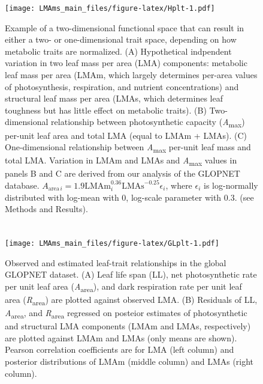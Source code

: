 \documentclass[
  12pt,
]{article}
\providecommand{\DIFaddbeginFL}{} %
\providecommand{\DIFaddendFL}{} %
\providecommand{\DIFdelbeginFL}{} %
\providecommand{\DIFdelendFL}{} %
\newcommand{\DIFscaledelfig}{0.5}
\newlength{\DIFdelgraphicswidth} %
\newlength{\DIFdelgraphicsheight} %
\newcommand{\DIFaddincludegraphics}[2][]{{\color{blue}\fbox{\DIFOincludegraphics[#1]{#2}}}} %
\newcommand{\DIFdelincludegraphics}[2][]{%
\sbox{\DIFdelgraphicsbox}{\DIFOincludegraphics[#1]{#2}}%
\settoboxwidth{\DIFdelgraphicswidth}{\DIFdelgraphicsbox} %
\settoboxtotalheight{\DIFdelgraphicsheight}{\DIFdelgraphicsbox} %
\scalebox{\DIFscaledelfig}{%
\parbox[b]{\DIFdelgraphicswidth}{\usebox{\DIFdelgraphicsbox}\\[-\baselineskip] \rule{\DIFdelgraphicswidth}{0em}}\llap{\resizebox{\DIFdelgraphicswidth}{\DIFdelgraphicsheight}{%
\setlength{\unitlength}{\DIFdelgraphicswidth}%
\begin{picture}(1,1)%
\thicklines\linethickness{2pt} %
{\color[rgb]{1,0,0}\put(0,0){\framebox(1,1){}}}%
{\color[rgb]{1,0,0}\put(0,0){\line( 1,1){1}}}%
{\color[rgb]{1,0,0}\put(0,1){\line(1,-1){1}}}%
\end{picture}%
}\hspace*{3pt}}} %
} %
\DeclareRobustCommand{\DIFaddbeginFL}{\DIFOaddbeginFL \let\includegraphics\DIFaddincludegraphics} %
\DeclareRobustCommand{\DIFaddendFL}{\DIFOaddendFL \let\includegraphics\DIFOincludegraphics} %
\DeclareRobustCommand{\DIFdelbeginFL}{\DIFOdelbeginFL \let\includegraphics\DIFdelincludegraphics} %
\DeclareRobustCommand{\DIFdelendFL}{\DIFOaddendFL \let\includegraphics\DIFOincludegraphics} %
\begin{document}
\begin{figure}
\centering
\DIFdelbeginFL %
\DIFdelendFL \DIFaddbeginFL \texttt{[image: LMAms\_main\_files/figure-latex/Hplt-1.pdf]}
\DIFaddendFL \caption{\label{fig:Hplt}Example of a two-dimensional functional space that can result in either a two- or one-dimensional trait space, depending on how metabolic traits are normalized. (A) Hypothetical indpendent variation in two leaf mass per area (LMA) components: metabolic leaf mass per area (LMAm, which largely determines per-area values of photosynthesis, respiration, and nutrient concentrations) and structural leaf mass per area (LMAs, which determines leaf toughness but has little effect on metabolic traits). (B) Two-dimensional relationship between photosynthetic capacity (\emph{A}\textsubscript{max}) per-unit leaf area and total LMA (equal to LMAm + LMAs). (C) One-dimensional relationship between \emph{A}\textsubscript{max} per-unit leaf mass and total LMA. Variation in LMAm and LMAs and \emph{A}\textsubscript{max} values in panels B and C are derived from our analysis of the GLOPNET database. \(A_{\mathrm{area} \, i}=1.9\mathrm{LMAm}_i^{0.36}\mathrm{LMAs}^{-0.25}\epsilon_i\), where \(\epsilon_i\) is log-normally distributed with log-mean with 0, log-scale parameter with 0.3. (see Methods and Results).}
\end{figure}

\newpage

\hypertarget{section-2}{%
\section{}\label{section-2}}

\begin{figure}
\centering
\DIFdelbeginFL %
\DIFdelendFL \DIFaddbeginFL \texttt{[image: LMAms\_main\_files/figure-latex/GLplt-1.pdf]}
\DIFaddendFL \caption{\label{fig:GLplt}Observed and estimated leaf-trait relationships in the global GLOPNET dataset. (A) Leaf life span (LL), net photosynthetic rate per unit leaf area (\emph{A}\textsubscript{area}), and dark respiration rate per unit leaf area (\emph{R}\textsubscript{area}) are plotted against observed LMA. (B) Residuals of LL, \emph{A}\textsubscript{area}, and \emph{R}\textsubscript{area} regressed on posteior estimates of photosynthetic and structural LMA components (LMAm and LMAs, respectively) are plotted against LMAm and LMAs (only means are shown). Pearson correlation coefficients are for LMA (left column) and posterior distributions of LMAm (middle column) and LMAs (right column).}
\end{figure}
\end{document}
